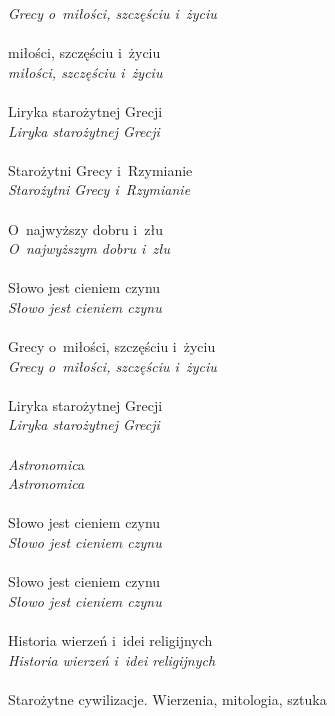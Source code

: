 \documentclass[a4paper,11pt]{article}
\begin{document}
\Powin \emph{Grecy o~miłości, szczęściu i~życiu} \\
 \\
\Jest  miłości, szczęściu i~życiu \\
\Powin \emph{miłości, szczęściu i~życiu} \\
 \\
\Jest  Liryka starożytnej Grecji \\
\Powin \emph{Liryka starożytnej Grecji} \\
 \\
\Jest  Starożytni Grecy i~Rzymianie \\
\Powin \emph{Starożytni Grecy i~Rzymianie} \\
 \\
\Jest  O~najwyższy dobru i~złu \\
\Powin \emph{O~najwyższym dobru i~złu} \\
 \\
\Jest  Słowo jest cieniem czynu \\
\Powin \emph{Słowo jest cieniem czynu} \\
 \\
\Jest  Grecy o~miłości, szczęściu i~życiu \\
\Powin \emph{Grecy o~miłości, szczęściu i~życiu} \\
 \\
\Jest  Liryka starożytnej Grecji \\
\Powin \emph{Liryka starożytnej Grecji} \\
 \\
\Jest  \emph{Astronomic}a \\
\Powin \emph{Astronomica} \\
 \\
\Jest  Słowo jest cieniem czynu \\
\Powin \emph{Słowo jest cieniem czynu} \\
 \\
\Jest  Słowo jest cieniem czynu \\
\Powin \emph{Słowo jest cieniem czynu} \\
 \\
\Jest  Historia wierzeń i~idei religijnych \\
\Powin \emph{Historia wierzeń i~idei religijnych} \\
 \\
\Jest  Starożytne cywilizacje. Wierzenia, mitologia, sztuka \\
\end{document}
